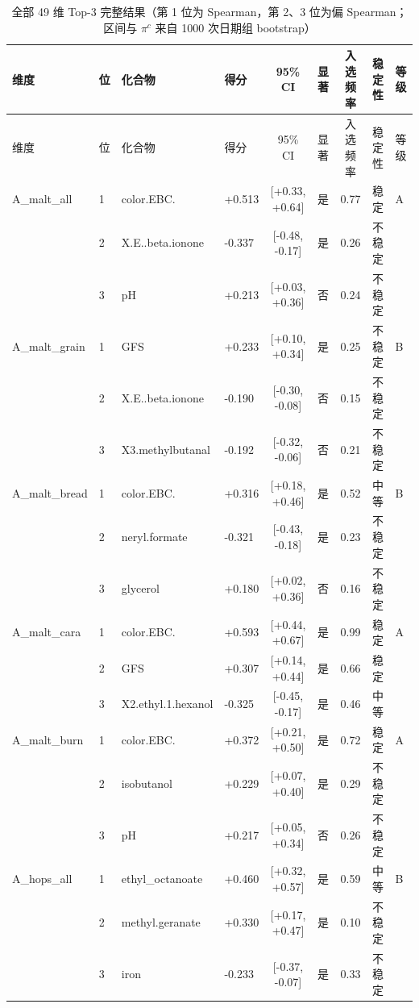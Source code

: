 \begin{longtable}{llllcccll}
\caption{全部 49 维 Top-3 完整结果（第 1 位为 Spearman，第 2、3 位为偏 Spearman；区间与 $\pi^c$ 来自 1000 次日期组 bootstrap）}\label{tab:q2_top3}\\
\toprule
维度 & 位 & 化合物 & 得分 & 95\% CI & 显著 & 入选频率 & 稳定性 & 等级 \\
\midrule
\endfirsthead
\toprule
维度 & 位 & 化合物 & 得分 & 95\% CI & 显著 & 入选频率 & 稳定性 & 等级 \\
\midrule
\endhead
\bottomrule
\endfoot
A\_malt\_all & 1 & color.EBC. & +0.513 & [+0.33, +0.64] & 是 & 0.77 & 稳定 & A \\
 & 2 & X.E..beta.ionone & -0.337 & [-0.48, -0.17] & 是 & 0.26 & 不稳定 &  \\
 & 3 & pH & +0.213 & [+0.03, +0.36] & 否 & 0.24 & 不稳定 &  \\
A\_malt\_grain & 1 & GFS & +0.233 & [+0.10, +0.34] & 是 & 0.25 & 不稳定 & B \\
 & 2 & X.E..beta.ionone & -0.190 & [-0.30, -0.08] & 否 & 0.15 & 不稳定 &  \\
 & 3 & X3.methylbutanal & -0.192 & [-0.32, -0.06] & 否 & 0.21 & 不稳定 &  \\
A\_malt\_bread & 1 & color.EBC. & +0.316 & [+0.18, +0.46] & 是 & 0.52 & 中等 & B \\
 & 2 & neryl.formate & -0.321 & [-0.43, -0.18] & 是 & 0.23 & 不稳定 &  \\
 & 3 & glycerol & +0.180 & [+0.02, +0.36] & 否 & 0.16 & 不稳定 &  \\
A\_malt\_cara & 1 & color.EBC. & +0.593 & [+0.44, +0.67] & 是 & 0.99 & 稳定 & A \\
 & 2 & GFS & +0.307 & [+0.14, +0.44] & 是 & 0.66 & 稳定 &  \\
 & 3 & X2.ethyl.1.hexanol & -0.325 & [-0.45, -0.17] & 是 & 0.46 & 中等 &  \\
A\_malt\_burn & 1 & color.EBC. & +0.372 & [+0.21, +0.50] & 是 & 0.72 & 稳定 & A \\
 & 2 & isobutanol & +0.229 & [+0.07, +0.40] & 是 & 0.29 & 不稳定 &  \\
 & 3 & pH & +0.217 & [+0.05, +0.34] & 否 & 0.26 & 不稳定 &  \\
A\_hops\_all & 1 & ethyl\_octanoate & +0.460 & [+0.32, +0.57] & 是 & 0.59 & 中等 & B \\
 & 2 & methyl.geranate & +0.330 & [+0.17, +0.47] & 是 & 0.10 & 不稳定 &  \\
 & 3 & iron & -0.233 & [-0.37, -0.07] & 是 & 0.33 & 不稳定 &  \\

\end{longtable}
